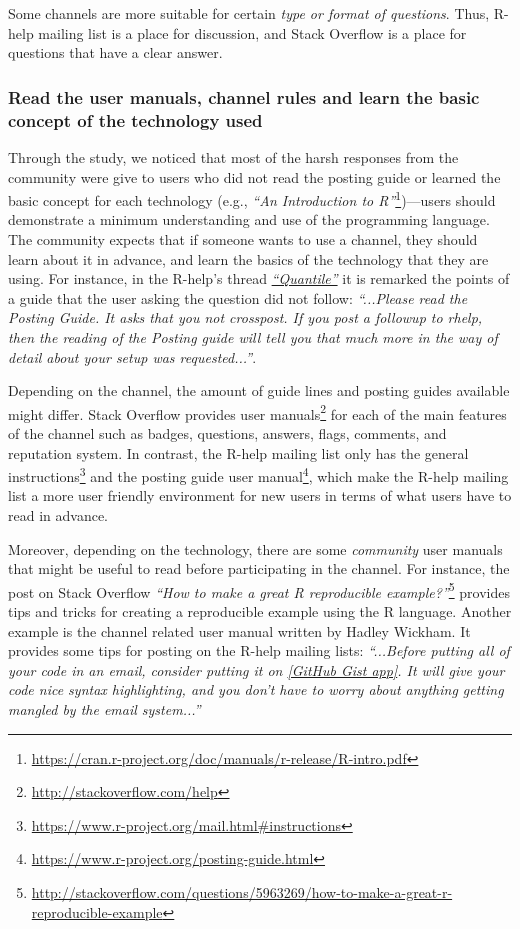         Some channels are more suitable for certain \emph{type or format of questions}. 
        Thus, R-help mailing list is a place for discussion, and Stack Overflow is a place for questions that have a clear answer.


    \subsubsection{Read the user manuals, channel rules and learn the basic concept of the technology used}

        Through the study, we noticed that most of the harsh responses from the community were give to users who did not read the posting guide or learned the basic concept for each technology (e.g., \textit{``An Introduction to R''}\footnote{\url{https://cran.r-project.org/doc/manuals/r-release/R-intro.pdf}})---users should demonstrate a minimum understanding and use of the programming language.
        The community expects that if someone wants to use a channel, they should learn about it in advance, and learn the basics of the technology that they are using.
        For instance, in the R-help's thread \textit{\href{http://goo.gl/Dc8gXw}{``Quantile''}} it is remarked the points of a guide that the user asking the question did not follow: \textit{``...Please read the Posting Guide. It asks that you not crosspost. If you post a followup to rhelp, then the reading of the Posting guide will tell you that much more in the way of detail about your setup was requested...''}.

        Depending on the channel, the amount of guide lines and posting guides available might differ. 
        Stack Overflow provides user manuals\footnote{\url{http://stackoverflow.com/help}} for each of the main features of the channel such as badges, questions, answers, flags, comments, and reputation system.
        In contrast, the R-help mailing list only has the general instructions\footnote{\url{https://www.r-project.org/mail.html\#instructions}} and the posting guide user manual\footnote{\url{https://www.r-project.org/posting-guide.html}}, which make the R-help mailing list a more user friendly environment for new users in terms of what users have to read in advance.

        Moreover, depending on the technology, there are some \textit{community} user manuals that might be useful to read before participating in the channel.
        For instance, the post on Stack Overflow \textit{``How to make a great R reproducible example?''}\footnote{\url{http://stackoverflow.com/questions/5963269/how-to-make-a-great-r-reproducible-example}} provides tips and tricks for creating a reproducible example using the R language.
        Another example is the channel related user manual written by Hadley Wickham.
        It provides some tips for posting on the R-help mailing lists: \textit{``...Before putting all of your code in an email, consider putting it on \href{http://gist.github.com/}{[GitHub Gist app]}. It will give your code nice syntax highlighting, and you don't have to worry about anything getting mangled by the email system...''}

